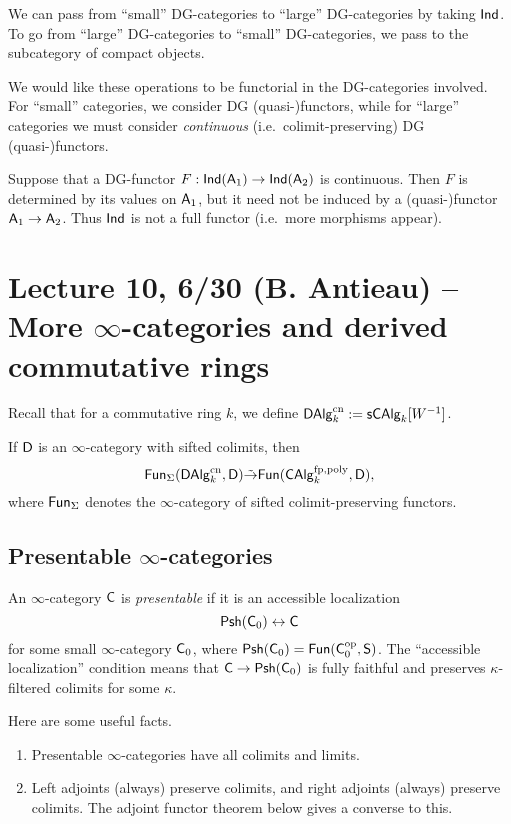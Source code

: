 \documentclass{amsart}
\begin{document}
We can pass from ``small'' DG-categories to ``large'' DG-categories by taking $\mathsf{Ind}$.
To go from ``large'' DG-categories to ``small'' DG-categories, we pass to the subcategory of compact objects.

We would like these operations to be functorial in the DG-categories involved.
For ``small'' categories, we consider DG (quasi-)functors, while for ``large'' categories we must consider \emph{continuous} (i.e.\ colimit-preserving) DG (quasi-)functors.

Suppose that a DG-functor $F: \mathsf{Ind}(\mathsf{A}_1) \to \mathsf{Ind}(\mathsf{A}_2)$ is continuous.
Then $F$ is determined by its values on $\mathsf{A}_1$, but it need not be induced by a (quasi-)functor $\mathsf{A}_1 \to \mathsf{A}_2$.
Thus $\mathsf{Ind}$ is not a full functor (i.e.\ more morphisms appear).

\section{Lecture 10, 6/30 (B. Antieau) -- More $\infty$-categories and derived commutative rings} 

Recall that for a commutative ring $k$, we define $\mathsf{DAlg}_k^{\mathrm{cn}} := \mathsf{s}\mathsf{CAlg}_k[W^{-1}]$.

\begin{thm}
	If $\mathsf{D}$ is an $\infty$-category with sifted colimits, then
	\[
		\mathsf{Fun}_\Sigma(\mathsf{DAlg}_k^{\mathrm{cn}}, \mathsf{D}) \tilde{\to} \mathsf{Fun}(\mathsf{CAlg}_k^{\mathrm{fp,poly}}, \mathsf{D}),
	\]
	where $\mathsf{Fun}_\Sigma$ denotes the $\infty$-category of sifted colimit-preserving functors.
\end{thm}

\subsection{Presentable $\infty$-categories}

\begin{dfn}
	An $\infty$-category $\mathsf{C}$ is \emph{presentable} if it is an accessible localization
	\[
		\mathsf{Psh}(\mathsf{C}_0) \leftrightarrow \mathsf{C}
	\]
	for some small $\infty$-category $\mathsf{C}_0$, where $\mathsf{Psh}(\mathsf{C}_0) = \mathsf{Fun}(\mathsf{C}_0^{\mathrm{op}}, \mathsf{S})$.
	The ``accessible localization'' condition means that $\mathsf{C} \to \mathsf{Psh}(\mathsf{C}_0)$ is fully faithful and preserves $\kappa$-filtered colimits for some $\kappa$.
\end{dfn}

Here are some useful facts.
\begin{enumerate}
	\item Presentable $\infty$-categories have all colimits and limits.
	\item Left adjoints (always) preserve colimits, and right adjoints (always) preserve colimits.
		The adjoint functor theorem below gives a converse to this.
\end{enumerate}
\end{document}
